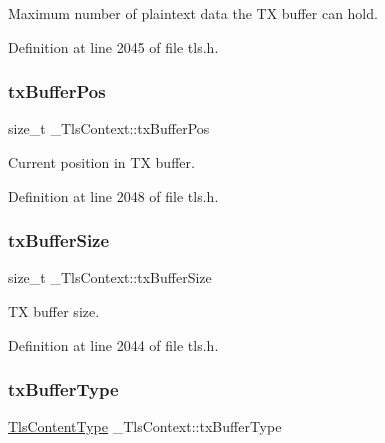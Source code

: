 Maximum number of plaintext data the TX buffer can hold. 



Definition at line 2045 of file tls.\+h.

\mbox{\label{struct__TlsContext_a8db8af31a881f00e98feb5f454dd0706}} 
\subsubsection{\texorpdfstring{tx\+Buffer\+Pos}{txBufferPos}}
{\footnotesize\ttfamily size\+\_\+t \+\_\+\+Tls\+Context\+::tx\+Buffer\+Pos}



Current position in TX buffer. 



Definition at line 2048 of file tls.\+h.

\mbox{\label{struct__TlsContext_ade33b16266288909a7a350f90778f141}} 
\subsubsection{\texorpdfstring{tx\+Buffer\+Size}{txBufferSize}}
{\footnotesize\ttfamily size\+\_\+t \+\_\+\+Tls\+Context\+::tx\+Buffer\+Size}



TX buffer size. 



Definition at line 2044 of file tls.\+h.

\mbox{\label{struct__TlsContext_ae3c1afa4445a2942466444f01860044e}} 
\subsubsection{\texorpdfstring{tx\+Buffer\+Type}{txBufferType}}
{\footnotesize\ttfamily \hyperlink{tls_8h_a6fad1efb9f011dc3f76039976bef896c}{Tls\+Content\+Type} \+\_\+\+Tls\+Context\+::tx\+Buffer\+Type}



